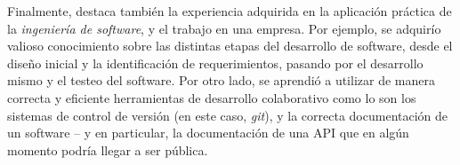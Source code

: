 \documentclass[11pt,letterpaper]{article}
\begin{document}
Finalmente, destaca también la experiencia adquirida en la aplicación práctica de la \emph{ingeniería de software}, y el trabajo en una empresa. Por ejemplo, se adquirío valioso conocimiento sobre las distintas etapas del desarrollo de software, desde el diseño inicial y la identificación de requerimientos, pasando por el desarrollo mismo y el testeo del software. Por otro lado, se aprendió a utilizar de manera correcta y eficiente herramientas de desarrollo colaborativo como lo son los sistemas de control de versión (en este caso, \emph{git}), y la correcta documentación de un software -- y en particular, la documentación de una API que en algún momento podría llegar a ser pública.
\newpage
%
%
%
%
\end{document}
